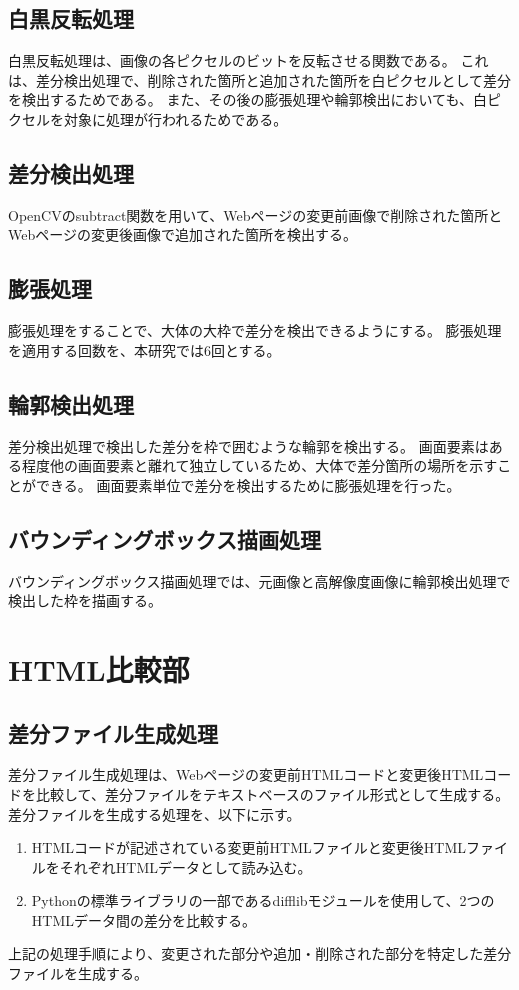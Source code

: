 \subsection{白黒反転処理}\label{subsec:reverse}
白黒反転処理は、画像の各ピクセルのビットを反転させる関数である。
これは、差分検出処理で、削除された箇所と追加された箇所を白ピクセルとして差分を検出するためである。
また、その後の膨張処理や輪郭検出においても、白ピクセルを対象に処理が行われるためである。

\subsection{差分検出処理}\label{subsec:difference_detection_process}
OpenCVのsubtract関数を用いて、Webページの変更前画像で削除された箇所とWebページの変更後画像で追加された箇所を検出する。

\subsection{膨張処理}\label{subsec:dilation}
膨張処理をすることで、大体の大枠で差分を検出できるようにする。
膨張処理を適用する回数を、本研究では6回とする。

\subsection{輪郭検出処理}\label{subsec:contour_detection_processing}
差分検出処理で検出した差分を枠で囲むような輪郭を検出する。
画面要素はある程度他の画面要素と離れて独立しているため、大体で差分箇所の場所を示すことができる。
画面要素単位で差分を検出するために膨張処理を行った。

\subsection{バウンディングボックス描画処理}\label{subsec:Bounding box drawing process}
バウンディングボックス描画処理では、元画像と高解像度画像に輪郭検出処理で検出した枠を描画する。


\section{HTML比較部}\label{sec:diff_html}

\subsection{差分ファイル生成処理}\label{subsec:diff_file_generate}
差分ファイル生成処理は、Webページの変更前HTMLコードと変更後HTMLコードを比較して、差分ファイルをテキストベースのファイル形式として生成する。
差分ファイルを生成する処理を、以下に示す。
\begin{enumerate}
    \item HTMLコードが記述されている変更前HTMLファイルと変更後HTMLファイルをそれぞれHTMLデータとして読み込む。
    \item Pythonの標準ライブラリの一部であるdifflibモジュールを使用して、2つのHTMLデータ間の差分を比較する。
\end{enumerate}
上記の処理手順により、変更された部分や追加・削除された部分を特定した差分ファイルを生成する。

